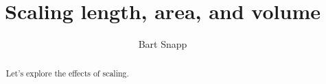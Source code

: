 \documentclass[handout,nooutcomes,noauthor]{ximera}
\title{Scaling length, area, and volume}
\author{Bart Snapp}
\begin{document}
\begin{abstract}
  Let's explore the effects of scaling.
\end{abstract}
\maketitle


\begin{listOutcomes}
\item 
\end{listOutcomes}
\end{document}
